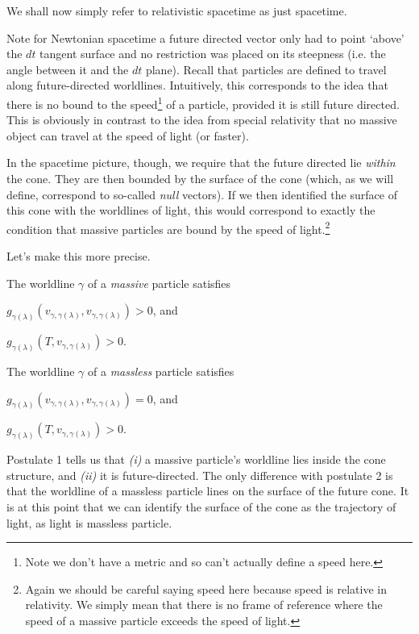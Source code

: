 \bnn
    We shall now simply refer to relativistic spacetime as just spacetime.
\enn 

Note for Newtonian spacetime a future directed vector only had to point `above' the $dt$ tangent surface and no restriction was placed on its steepness (i.e. the angle between it and the $dt$ plane). Recall that particles are defined to travel along future-directed worldlines. Intuitively, this corresponds to the idea that there is no bound to the speed\footnote{Note we don't have a metric and so can't actually define a speed here.} of a particle, provided it is still future directed. This is obviously in contrast to the idea from special relativity that no massive object can travel at the speed of light (or faster).
    
In the spacetime picture, though, we require that the future directed lie \textit{within} the cone. They are then bounded by the surface of the cone (which, as we will define, correspond to so-called \textit{null} vectors). If we then identified the surface of this cone with the worldlines of light, this would correspond to exactly the condition that massive particles are bound by the speed of light.\footnote{Again we should be careful saying speed here because speed is relative in relativity. We simply mean that there is no frame of reference where the speed of a massive particle exceeds the speed of light.} 

Let's make this more precise. 

\bpo 
\label{post:WorldlineMassive}
    The worldline $\gamma$ of a \textit{massive} particle satisfies
    \benr 
        \item $g_{\gamma(\lambda)}(v_{\gamma,\gamma(\lambda)},v_{\gamma,\gamma(\lambda)}) >0$, and 
        \item $g_{\gamma(\lambda)}(T,v_{\gamma,\gamma(\lambda)}) >0$.
    \een 
\epo

\bpo 
\label{post:WorldlineMassless}
    The worldline $\gamma$ of a \textit{massless} particle satisfies 
    \benr 
        \item $g_{\gamma(\lambda)}(v_{\gamma,\gamma(\lambda)},v_{\gamma,\gamma(\lambda)}) =0$, and 
        \item $g_{\gamma(\lambda)}(T,v_{\gamma,\gamma(\lambda)}) >0$.
    \een 
\epo 

Postulate 1 tells us that \textit{(i)} a massive particle's worldline lies inside the cone structure, and \textit{(ii)} it is future-directed. The only difference with postulate 2 is that the worldline of a massless particle lines on the surface of the future cone. It is at this point that we can identify the surface of the cone as the trajectory of light, as light is massless particle. 

